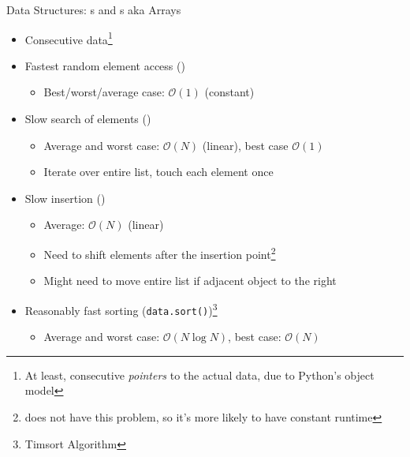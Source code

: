\begin{frame}{Data Structures: s and s aka Arrays}
%
\begin{itemize}
\item Consecutive data\footnote{At least, consecutive \emph{pointers} to the actual data, due to Python's object model}
\item Fastest random element access ()
	\begin{itemize}
	\item Best/worst/average case: $\mathcal{O}(1)$ (constant)
	\end{itemize}
\item Slow search of elements ()
	\begin{itemize}
	\item Average and worst case: $\mathcal{O}(N)$ (linear), best case $\mathcal{O}(1)$
	\item Iterate over entire list, touch each element once
	\end{itemize}
\item Slow insertion ()
	\begin{itemize}
	\item Average: $\mathcal{O}(N)$ (linear)
	\item Need to shift elements after the insertion point\footnote{ does not have this problem, so it's more likely to have constant runtime}
	\item Might need to move entire list if adjacent object to the right
	\end{itemize}
\item Reasonably fast sorting (\texttt{data.sort()})\footnote{Timsort Algorithm}
	\begin{itemize}
	\item Average and worst case: $\mathcal{O}(N \log N)$, best case: $\mathcal{O}(N)$
	\end{itemize}
\end{itemize}
%
\end{frame}


